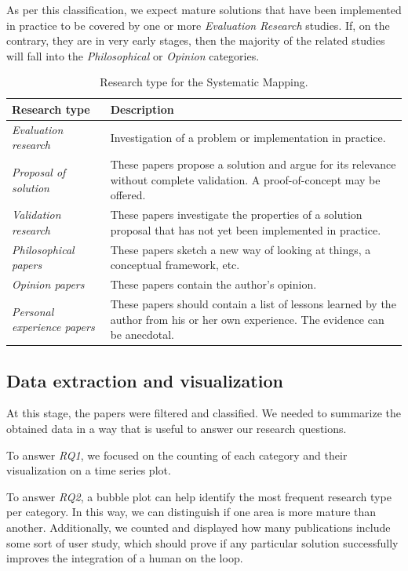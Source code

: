 As per this classification, we expect mature solutions that have been
implemented in practice to be covered by one or more \emph{Evaluation Research}
studies. If, on the contrary, they are in very early stages, then the majority
of the related studies will fall into the \emph{Philosophical} or
\emph{Opinion} categories.

\begin{table}[hptb]
  \small
  \begin{tabularx}{\textwidth}{l >{\raggedright\arraybackslash}X}
    \hline
    \textbf{Research type} & \textbf{Description} \\
    \hline
    \textit{Evaluation research} & Investigation of a problem or implementation in practice. \\
    \textit{Proposal of solution} & These papers propose a solution and argue for its relevance without
      complete validation. A proof-of-concept may be offered. \\
    \textit{Validation research} & These papers investigate the properties of a solution proposal that
      has not yet been implemented in practice. \\
    \textit{Philosophical papers} & These papers sketch a new way of looking at things, a conceptual
      framework, etc. \\
    \textit{Opinion papers} & These papers contain the author's opinion. \\
    \textit{Personal experience papers} & These papers should contain a list of lessons learned by the
      author from his or her own experience. The evidence can be anecdotal. \\
  \end{tabularx}
  \caption{Research type for the Systematic Mapping.}\label{tab:mapping/research_type}
\end{table}

\subsection{Data extraction and visualization}
At this stage, the papers were filtered and classified. We needed to summarize
the obtained data in a way that is useful to answer our research questions.

To answer \emph{RQ1}, we focused on the counting of each category
and their visualization on a time series plot.

To answer \emph{RQ2}, a bubble plot can help identify
the most frequent research type per category. In this way, we can distinguish if
one area is more mature than another. Additionally, we counted and displayed
how many publications include some sort of user study, which should prove
if any particular solution successfully improves the integration of a
human on the loop.

